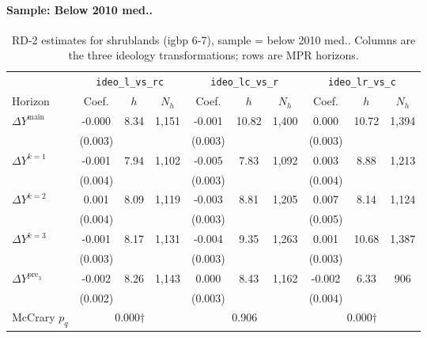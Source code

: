 \documentclass[11pt]{article}
\begin{document}
\paragraph{Sample: Below 2010 med..}
\begin{table}[H]
\centering
\scriptsize
\caption{RD-2 estimates for shrublands (igbp 6-7), sample = below 2010 med..
Columns are the three ideology transformations; rows are MPR horizons.}
\label{tab:rd2_shrublands_below}
\begin{tabular}{l ccc ccc ccc}
\toprule
 & \multicolumn{3}{c}{\texttt{ideo\_l\_vs\_rc}}
 & \multicolumn{3}{c}{\texttt{ideo\_lc\_vs\_r}}
 & \multicolumn{3}{c}{\texttt{ideo\_lr\_vs\_c}} \\
\cmidrule(lr){2-4} \cmidrule(lr){5-7} \cmidrule(lr){8-10}
Horizon & Coef. & $h$ & $N_h$ & Coef. & $h$ & $N_h$ & Coef. & $h$ & $N_h$ \\
\midrule
$\Delta Y^{\text{main}}$ & -0.000 & 8.34 & 1,151 & -0.001 & 10.82 & 1,400 & 0.000 & 10.72 & 1,394 \\
 & (0.003) &  &  & (0.003) &  &  & (0.003) &  &  \\
\addlinespace[1pt]
$\Delta Y^{k=1}$ & -0.001 & 7.94 & 1,102 & -0.005 & 7.83 & 1,092 & 0.003 & 8.88 & 1,213 \\
 & (0.004) &  &  & (0.003) &  &  & (0.004) &  &  \\
\addlinespace[1pt]
$\Delta Y^{k=2}$ & 0.001 & 8.09 & 1,119 & -0.003 & 8.81 & 1,205 & 0.007 & 8.14 & 1,124 \\
 & (0.004) &  &  & (0.003) &  &  & (0.005) &  &  \\
\addlinespace[1pt]
$\Delta Y^{k=3}$ & -0.001 & 8.17 & 1,131 & -0.004 & 9.35 & 1,263 & 0.001 & 10.68 & 1,387 \\
 & (0.003) &  &  & (0.003) &  &  & (0.003) &  &  \\
\addlinespace[1pt]
$\Delta Y^{\text{pre}_3}$ & -0.002 & 8.26 & 1,143 & 0.000 & 8.43 & 1,162 & -0.002 & 6.33 & 906 \\
 & (0.002) &  &  & (0.003) &  &  & (0.004) &  &  \\
\addlinespace[1pt]
\midrule
McCrary $p_q$ & \multicolumn{3}{c}{0.000$\dagger$} & \multicolumn{3}{c}{0.906} & \multicolumn{3}{c}{0.000$\dagger$} \\
\bottomrule
\end{tabular}
\end{table}
\end{document}
